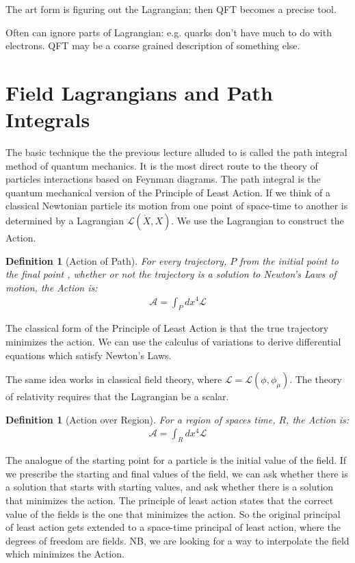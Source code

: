 \documentclass[]{article}
\newtheorem{defn}[thm]{Definition}
\begin{document}
The art form is figuring out the Lagrangian; then QFT becomes a precise tool.

Often can ignore parts of Lagrangian: e.g. quarks don't have much to do with electrons. QFT may be a coarse grained description of something else.
 

\section{Field Lagrangians and Path Integrals}

The basic technique the the previous lecture alluded to is called the path integral method of quantum mechanics. It is the most direct route to the theory of particles interactions based on Feynman diagrams. The path integral is the quantum mechanical version of the Principle of Least Action. If we think of a classical Newtonian particle its motion from one point of space-time to another is determined by a Lagrangian $\mathcal{L}(\dot{X},X)$. We use the Lagrangian to construct the Action. 

\begin{defn}[Action of Path]
	For every trajectory, $P$ from the initial point to the final point , whether or not the trajectory is a solution to Newton's Laws of motion,  the Action is: 
	\begin{align*}
		\mathcal{A}=\int_P dx^4 \mathcal{L}
	\end{align*}
\end{defn}

The classical form of the Principle of Least Action is that the true trajectory minimizes the action. We can use the calculus of variations to derive differential equations which satisfy Newton's Laws.

The same idea works in classical field theory, where $\mathcal{L}=\mathcal{L}(\phi,\phi_\mu)$. The theory of relativity requires that the Lagrangian be a scalar.

\begin{defn}[Action over Region]
	For a region of spaces time, $R$,  the Action is: 
	\begin{align*}
		\mathcal{A}=\int_R dx^4 \mathcal{L}
	\end{align*}
\end{defn}

The analogue of the starting point for a particle is the initial value of the field. If we prescribe the starting and final values of the field, we can ask whether there is a solution that starts with starting values, and ask whether there is a solution that minimizes the action. The principle of least action states that the correct value of the fields is the one that minimizes the action. So the original principal of least action gets extended to a space-time principal of least action, where the degrees of freedom are fields. NB, we are looking for a way to interpolate the field which minimizes the Action.
\end{document}
